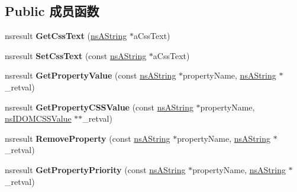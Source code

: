 \subsection*{Public 成员函数}
\begin{DoxyCompactItemize}
\item 
\mbox{\label{interfacens_i_d_o_m_c_s_s_style_declaration_a820a41c354491af20f0f1003394135f3}} 
nsresult {\bfseries Get\+Css\+Text} (\hyperlink{structns_string_container}{ns\+A\+String} $\ast$a\+Css\+Text)
\item 
\mbox{\label{interfacens_i_d_o_m_c_s_s_style_declaration_a9623f36803b070f8d84e0599cb6bae29}} 
nsresult {\bfseries Set\+Css\+Text} (const \hyperlink{structns_string_container}{ns\+A\+String} $\ast$a\+Css\+Text)
\item 
\mbox{\label{interfacens_i_d_o_m_c_s_s_style_declaration_a30698fca440059fd3bbcdb11725b33af}} 
nsresult {\bfseries Get\+Property\+Value} (const \hyperlink{structns_string_container}{ns\+A\+String} $\ast$property\+Name, \hyperlink{structns_string_container}{ns\+A\+String} $\ast$\+\_\+retval)
\item 
\mbox{\label{interfacens_i_d_o_m_c_s_s_style_declaration_a70fd19f1904d585d3ff0b13895b4f77c}} 
nsresult {\bfseries Get\+Property\+C\+S\+S\+Value} (const \hyperlink{structns_string_container}{ns\+A\+String} $\ast$property\+Name, \hyperlink{interfacens_i_supports}{ns\+I\+D\+O\+M\+C\+S\+S\+Value} $\ast$$\ast$\+\_\+retval)
\item 
\mbox{\label{interfacens_i_d_o_m_c_s_s_style_declaration_ad96b7c2cff5b75f0125a003b4ce5f00d}} 
nsresult {\bfseries Remove\+Property} (const \hyperlink{structns_string_container}{ns\+A\+String} $\ast$property\+Name, \hyperlink{structns_string_container}{ns\+A\+String} $\ast$\+\_\+retval)
\item 
\mbox{\label{interfacens_i_d_o_m_c_s_s_style_declaration_a5083528e33586161bad360d6e20ef302}} 
nsresult {\bfseries Get\+Property\+Priority} (const \hyperlink{structns_string_container}{ns\+A\+String} $\ast$property\+Name, \hyperlink{structns_string_container}{ns\+A\+String} $\ast$\+\_\+retval)
$$
\end{DoxyCompactItemize}
